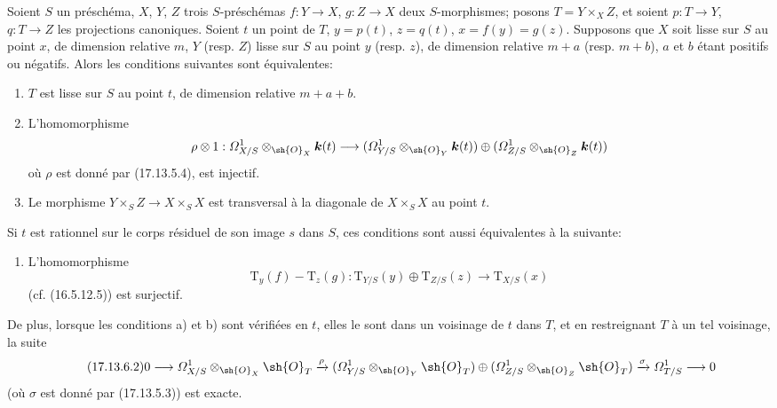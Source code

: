 \begin{corollary}[17.13.6]
Soient $S$ un préschéma, $X$, $Y$, $Z$ trois $S$-préschémas $f:Y\to X$, $g:Z\to X$ deux $S$-morphismes; posons $T=Y\times_XZ$, et soient $p:T\to Y$, $q:T\to Z$ les projections canoniques. Soient $t$ un point de $T$, $y=p(t)$, $z=q(t)$, $x=f(y)=g(z)$. Supposons que $X$ soit lisse sur $S$ au point $x$, de dimension relative $m$, $Y$ \textup{(resp. $Z$)} lisse sur $S$ au point $y$ \textup{(resp. $z$)}, de dimension relative $m+a$ \textup{(resp. $m+b$)}, $a$ et $b$ étant positifs ou négatifs. Alors les conditions suivantes sont équivalentes:
\begin{enumerate}
  \item[\textup{a)}] $T$ est lisse sur $S$ au point $t$, de dimension relative $m+a+b$.
  \item[\textup{b)}] L'homomorphisme
  \[
  \rho\otimes1:\varOmega^1_{X/S}\otimes_{\sh{O}_X}\boldsymbol{k}(t)\to
  (\varOmega^1_{Y/S}\otimes_{\sh{O}_Y}\boldsymbol{k}(t))\oplus
  (\varOmega^1_{Z/S}\otimes_{\sh{O}_Z}\boldsymbol{k}(t))
  \]
  où $\rho$ est donné par \textup{(17.13.5.4)}, est injectif.
  \item[\textup{c)}] Le morphisme $Y\times_SZ\to X\times_SX$ est transversal à la diagonale de $X\times_SX$ au point $t$.
\end{enumerate}

Si $t$ est rationnel sur le corps résiduel de son image $s$ dans $S$, ces conditions sont aussi équivalentes à la suivante:
\begin{enumerate}
  \item[\textup{b$'$)}] L'homomorphisme
  \[
  \label{IV.17.13.6.1}
  \tag{17.13.6.1}
  \mathrm{T}_y(f)-\mathrm{T}_z(g):\mathrm{T}_{Y/S}(y)\oplus\mathrm{T}_{Z/S}(z)\to\mathrm{T}_{X/S}(x)
  \]
  \textup{(cf. (16.5.12.5))} est surjectif.
\end{enumerate}

De plus, lorsque les conditions \textup{a)} et \textup{b)} sont vérifiées en $t$, elles le sont dans un voisinage de $t$ dans $T$, et en restreignant $T$ à un tel voisinage, la suite
\[
\label{IV.17.13.6.2}
\tag{17.13.6.2}
0\to\varOmega^1_{X/S}\otimes_{\sh{O}_X}\sh{O}_T\xrightarrow{\rho}
(\varOmega^1_{Y/S}\otimes_{\sh{O}_Y}\sh{O}_T)\oplus
(\varOmega^1_{Z/S}\otimes_{\sh{O}_Z}\sh{O}_T)
\xrightarrow{\sigma}\varOmega^1_{T/S}\to0
\]
\textup{(}où $\sigma$ est donné par \textup{(17.13.5.3))} est exacte.
\end{corollary}

